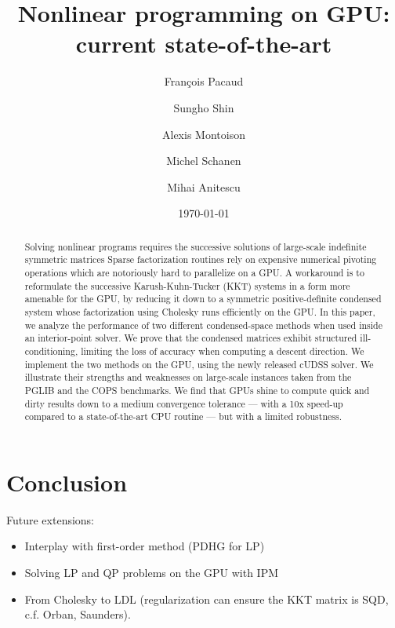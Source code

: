 \documentclass{article}
\title{Nonlinear programming on GPU: current state-of-the-art}
\author{François Pacaud \and
Sungho Shin \and
Alexis Montoison \and
Michel Schanen \and
Mihai Anitescu
}
\date{\today}
\theoremstyle{definition}
\theoremstyle{remark}
\begin{document}
\maketitle

\begin{abstract}
  Solving nonlinear programs requires the
  successive solutions of large-scale indefinite symmetric matrices
  Sparse factorization routines rely
  on expensive numerical pivoting operations
  which are notoriously hard to parallelize on a GPU.
  A workaround is to reformulate the successive Karush-Kuhn-Tucker (KKT) systems
  in a form more amenable for the GPU,
  by reducing it down to a symmetric positive-definite condensed
  system whose factorization using Cholesky runs efficiently on the GPU.
  In this paper, we analyze the performance of two different condensed-space methods
  when used inside an interior-point solver.
  We prove that the condensed matrices exhibit structured ill-conditioning,
  limiting the loss of accuracy when computing a descent direction.
  We implement the two methods on the GPU, using the newly
  released cUDSS solver. We illustrate their strengths and weaknesses
  on large-scale instances taken from the PGLIB and the COPS benchmarks.
  We find that GPUs shine to compute quick and dirty results down to a medium convergence tolerance
  --- with a 10x speed-up compared to a state-of-the-art CPU routine --- but
  with a limited robustness.
\end{abstract}











\section{Conclusion}
Future extensions:
\begin{itemize}
  \item Interplay with first-order method (PDHG for LP)
  \item Solving LP and QP problems on the GPU with IPM
  \item From Cholesky to LDL (regularization can
    ensure the KKT matrix is SQD, c.f. Orban, Saunders).
\end{itemize}





% 
\end{document}

